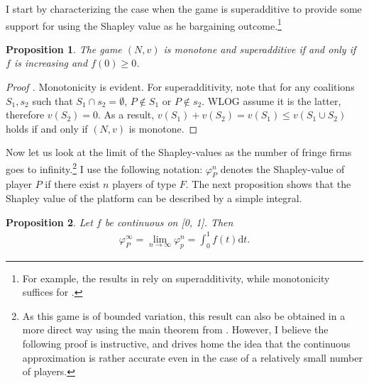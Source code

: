 \documentclass[a4paper]{article}
\newtheorem{proposition}{Proposition}
\newcommand{\dt}{\mathrm{d}t}
\begin{document}
I start by characterizing the case when the game is superadditive to provide some support for using the Shapley value as he bargaining outcome.\footnote{For example, the results in \textcite{gul1989bargaining} rely on superadditivity, while monotonicity suffices for \textcite[]{hart1996bargaining}.}

\begin{proposition}
    \label{prop:monotone}
    The game $(N, v)$ is monotone and superadditive if and only if $f$ is increasing and $f(0) \geq 0$. %
\end{proposition}

\begin{proof}[Proof%
    ]
    Monotonicity is evident. For superadditivity, note that for any coalitions $S_1, s_2$ such that $S_1 \cap s_2 = \emptyset$, $P \notin S_1$ or $P \notin s_2$. WLOG assume it is the latter, therefore $v(S_2) = 0$. As a result, $v(S_1) + v(S_2) = v(S_1) \leq v(S_1 \cup S_2)$ holds if and only if $(N, v)$ is monotone.
\end{proof}

Now let us look at the limit of the Shapley-values as the number of fringe firms goes to infinity.\footnote{
    As this game is of bounded variation, this result can also be obtained in a more direct way using the main theorem from \textcite{fogelman1980asymptotic}.
    However, I believe the following proof is instructive, and drives home the idea that the continuous approximation is rather accurate even in the case of a relatively small number of players.
}
I use the following notation: $\varphi_P^n$ denotes the Shapley-value of player $P$ if there exist $n$ players of type $F$.
The next proposition shows that the Shapley value of the platform can be described by a simple integral.

\begin{proposition}
    \label{prop:one_sided}
    Let $f$ be continuous on [0, 1]. Then
    \begin{align*}
        \varphi_P^\infty = \lim_{n \to \infty} \varphi_p^n = \int_0^1 f(t) \dt .
    \end{align*}
\end{proposition}
\end{document}
